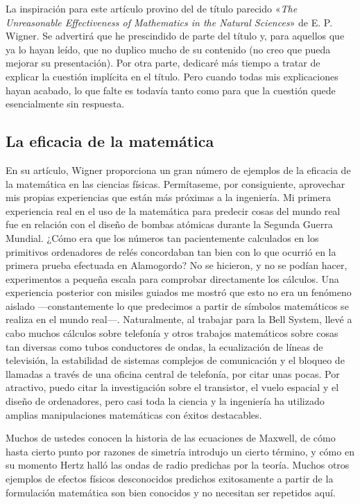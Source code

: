 \documentclass[a4paper, 12pt]{article}
\begin{document}
 

La inspiración para este artículo provino del de título parecido «{\it The Unreasonable Effectiveness of Mathematics in the Natural Sciences}»  de E. P. Wigner. Se advertirá que he prescindido de parte del título y, para aquellos que ya lo hayan leído, que no duplico mucho de su contenido (no creo que pueda mejorar su presentación). Por otra parte, dedicaré más tiempo a tratar de explicar la cuestión implícita en el título. Pero cuando todas mis explicaciones hayan acabado, lo que falte es todavía tanto como para que la cuestión quede esencialmente sin respuesta.

 

\subsection*{La eficacia de la matemática}

 En su artículo, Wigner proporciona un gran número de ejemplos de la eficacia de la matemática en las ciencias físicas. Permítaseme, por consiguiente, aprovechar mis propias experiencias que están más próximas a la ingeniería. Mi primera experiencia real en el uso de la matemática para predecir cosas del mundo real fue en relación con el diseño de bombas atómicas durante la Segunda Guerra Mundial. ¿Cómo era que los números tan pacientemente calculados en los primitivos ordenadores de relés concordaban tan bien con lo que ocurrió en la primera prueba efectuada en Alamogordo? No se hicieron, y no se podían hacer, experimentos a pequeña escala para comprobar directamente los cálculos. Una experiencia posterior con misiles guiados me mostró que esto no era un fenómeno aislado ---constantemente lo que predecimos a partir de símbolos matemáticos se realiza en el mundo real---. Naturalmente, al trabajar para la Bell System, llevé a cabo muchos cálculos sobre telefonía y otros trabajos matemáticos sobre cosas tan diversas como tubos conductores de ondas, la ecualización de líneas de televisión, la estabilidad de sistemas complejos de comunicación y el bloqueo de llamadas a través de una oficina central de telefonía, por citar unas pocas. Por atractivo, puedo citar la investigación sobre el transistor, el vuelo espacial y el diseño de ordenadores, pero casi toda la ciencia y la  ingeniería ha utilizado amplias manipulaciones matemáticas con éxitos destacables.

 

Muchos de ustedes conocen la historia de las ecuaciones de Maxwell, de cómo hasta cierto punto por razones de simetría introdujo un cierto término, y cómo en su momento Hertz halló las ondas de radio predichas por la teoría. Muchos otros ejemplos de efectos físicos desconocidos predichos exitosamente a partir de la formulación matemática son bien conocidos y no necesitan ser repetidos aquí.
\end{document}
